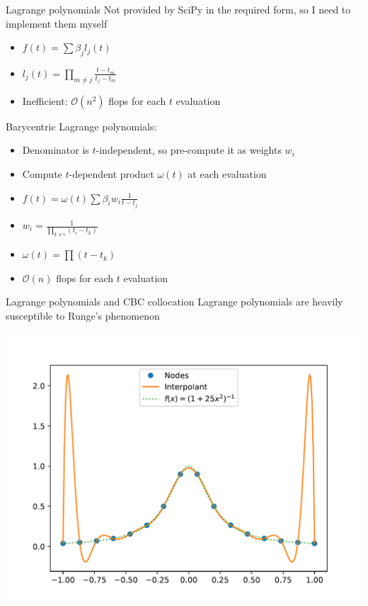 \documentclass[presentation]{beamer}
\begin{document}
\begin{frame}[label={sec:org18a46bb}]{Lagrange polynomials}
Not provided by SciPy in the required form, so I need to implement them myself
\vfill
\begin{itemize}
\item \(f(t) = \sum \beta_j l_j(t)\)
\item \(l_j(t) = \prod_{m\neq j} \frac{t - t_m}{t_j-t_m}\)
\item Inefficient: \(\mathcal{O}(n^2)\) flops for each \(t\) evaluation
\end{itemize}
\vfill
Barycentric Lagrange polynomials:
\begin{itemize}
\item Denominator is \(t\)-independent, so pre-compute it as weights \(w_i\)
\item Compute \(t\)-dependent product \(\omega(t)\) at each evaluation
\item \(f(t) = \omega(t)\sum \beta_iw_i \frac{1}{t - t_j}\)
\item \(w_i = \frac{1}{\prod_{k\neq i} (t_i - t_k)}\)
\item \(\omega(t) = \prod(t - t_k)\)
\item \(\mathcal{O}(n)\) flops for each \(t\) evaluation
\end{itemize}
\end{frame}

\begin{frame}[label={sec:org61a0ce3},plain]{Lagrange polynomials and CBC collocation}
Lagrange polynomials are heavily susceptible to Runge's phenomenon

\begin{center}
\includegraphics[width=\linewidth]{./runge.pdf}
\end{center}
\end{frame}
\end{document}
